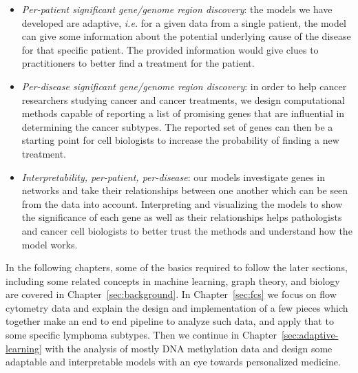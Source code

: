 \begin{itemize}
  \item \emph{Per-patient significant gene/genome region discovery}: the models
    we have developed are adaptive, \emph{i.e.} for a given data from a single
    patient, the model can give some information about the potential underlying
    cause of the disease for that specific patient. The provided information
    would give clues to practitioners to better find a treatment for the
    patient.
  \item \emph{Per-disease significant gene/genome region discovery}: in order
    to help cancer researchers studying cancer and cancer treatments, we design
    computational methods capable of reporting a list of promising genes that
    are influential in determining the cancer subtypes. The reported set of
    genes can then be a starting point for cell biologists to increase the
    probability of finding a new treatment.
  \item \emph{Interpretability, per-patient, per-disease}: our models
    investigate genes in networks and take their relationships between one
    another which can be seen from the data into account. Interpreting and
    visualizing the models to show the significance of each gene as well as
    their relationships helps pathologists and cancer cell biologists to better
    trust the methods and understand how the model works.
\end{itemize}

In the following chapters, some of the basics required to follow the later
sections, including some related concepts in machine learning, graph theory,
and biology are covered in Chapter~\ref{sec:background}. In
Chapter~\ref{sec:fcs} we focus on flow cytometry data and explain the design
and implementation of a few pieces which together make an end to end pipeline
to analyze such data, and apply that to some specific lymphoma subtypes. Then
we continue in Chapter~\ref{sec:adaptive-learning} with the analysis of mostly
DNA methylation data and design some adaptable and interpretable models with an
eye towards personalized medicine.
